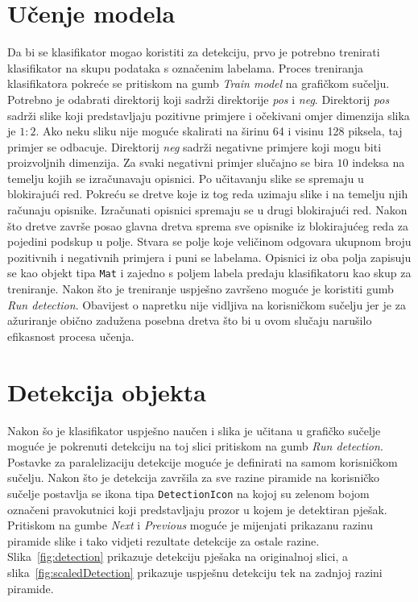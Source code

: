 \documentclass[times, utf8, zavrsni]{fer}
\begin{document}
\section{Učenje modela}
Da bi se klasifikator mogao koristiti za detekciju, prvo je potrebno trenirati klasifikator na skupu podataka s označenim labelama. Proces treniranja klasifikatora pokreće se pritiskom na gumb \textit{Train model} na grafičkom sučelju. Potrebno je odabrati direktorij koji sadrži direktorije \textit{pos} i \textit{neg}. Direktorij \textit{pos} sadrži slike koji predstavljaju pozitivne primjere i očekivani omjer dimenzija slika je \(1 : 2\). Ako neku sliku nije moguće skalirati na širinu 64 i visinu 128 piksela, taj primjer se odbacuje. Direktorij \textit{neg} sadrži negativne primjere koji mogu biti proizvoljnih dimenzija. Za svaki negativni primjer slučajno se bira \(10\) indeksa na temelju kojih se izračunavaju opisnici. Po učitavanju slike se spremaju u blokirajući red. Pokreću se dretve koje iz tog reda uzimaju slike i na temelju njih računaju opisnike. Izračunati opisnici spremaju se u drugi blokirajući red. Nakon što dretve završe posao glavna dretva sprema sve opisnike iz blokirajućeg reda za pojedini podskup u polje. Stvara se polje koje veličinom odgovara ukupnom broju pozitivnih i negativnih primjera i puni se labelama. Opisnici iz oba polja zapisuju se kao objekt tipa \verb|Mat| i zajedno s poljem labela predaju klasifikatoru kao skup za treniranje. Nakon što je treniranje uspješno završeno moguće je koristiti gumb \textit{Run detection}.  Obavijest o napretku nije vidljiva na korisničkom sučelju jer je za ažuriranje obično zadužena posebna dretva što bi u ovom slučaju narušilo efikasnost procesa učenja.

\section{Detekcija objekta}
Nakon šo je klasifikator uspješno naučen i slika je učitana u grafičko sučelje moguće je pokrenuti detekciju na toj slici pritiskom na gumb \textit{Run detection}. Postavke za paralelizaciju detekcije moguće je definirati na samom korisničkom sučelju. Nakon što je detekcija završila za sve razine piramide na korisničko sučelje postavlja se ikona tipa \verb|DetectionIcon| na kojoj su zelenom bojom označeni pravokutnici koji predstavljaju prozor u kojem je detektiran pješak. Pritiskom na gumbe \textit{Next} i \textit{Previous} moguće je mijenjati prikazanu razinu piramide slike i tako vidjeti rezultate detekcije za  ostale razine. Slika~\ref{fig:detection} prikazuje detekciju pješaka na originalnoj slici, a slika~\ref{fig:scaledDetection} prikazuje uspješnu detekciju tek na zadnjoj razini piramide.
\end{document}

